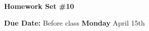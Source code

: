 
\usepackage{braket}

\def\ketY{\ensuremath{\ket {\Psi}}}
\def\iGeV{\ensuremath{\textrm{GeV}^{-1}}}
\def\mp{\ensuremath{m_{\textrm{proton}}}}
\def\rp{\ensuremath{r_{\textrm{proton}}}}
\def\me{\ensuremath{m_{\textrm{electron}}}}
\def\aG{\ensuremath{\alpha_G}}
\def\rAtom{\ensuremath{r_{\textrm{atom}}}}
\def\rNucl{\ensuremath{r_{\textrm{nucleus}}}}
\def\GN{\ensuremath{\textrm{G}_\textrm{N}}}

\def\be{\begin{equation*}}
\def\ee{\end{equation*}}


\usepackage{fancyhdr}
\usepackage{cancel}
\usepackage{ mathrsfs }





\fancyhf{}

\thispagestyle{fancy}






\begin{center}
{\huge \textbf{Homework Set \#10 }}
\large

{\textbf{ Due Date:} Before class {\textbf{Monday}} April 15th  } 
\end{center}

